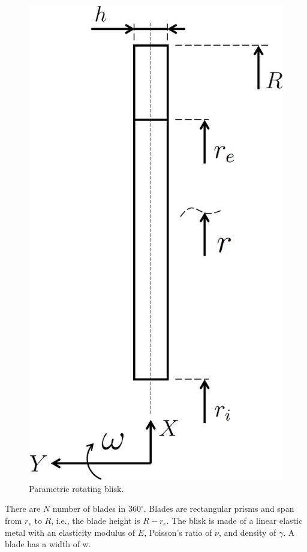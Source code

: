 \documentclass[12pt, a4paper, twoside]{article}
\begin{document}
\begin{figure}[h]
	\centering
	\includegraphics[scale=0.2]{parametric_blisk}
	\caption{Parametric rotating blisk.}
	\label{fig:parametric_blisk}
\end{figure}

There are $N$ number of blades in $360^\circ$. Blades are rectangular prisms and span from $r_e$ to $R$, i.e., the blade height is  $R-r_e$. The blisk is made of a linear elastic metal with an elasticity modulus of $E$, Poisson's ratio of $\nu$, and density of $\gamma$. A blade has a width of w.
\end{document}
